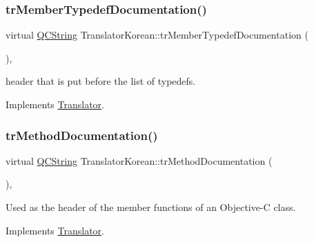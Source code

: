 \mbox{\label{class_translator_korean_a403e4a3b1720e6c420386296d72260aa}} 
\subsubsection{\texorpdfstring{trMemberTypedefDocumentation()}{trMemberTypedefDocumentation()}}
{\footnotesize\ttfamily virtual \mbox{\hyperlink{class_q_c_string}{Q\+C\+String}} Translator\+Korean\+::tr\+Member\+Typedef\+Documentation (\begin{DoxyParamCaption}{ }\end{DoxyParamCaption})\hspace{0.3cm}{\ttfamily [inline]}, {\ttfamily [virtual]}}

header that is put before the list of typedefs. 

Implements \mbox{\hyperlink{class_translator}{Translator}}.

\mbox{\label{class_translator_korean_a755dec4d84768a66ec18c401c23f5e97}} 
\subsubsection{\texorpdfstring{trMethodDocumentation()}{trMethodDocumentation()}}
{\footnotesize\ttfamily virtual \mbox{\hyperlink{class_q_c_string}{Q\+C\+String}} Translator\+Korean\+::tr\+Method\+Documentation (\begin{DoxyParamCaption}{ }\end{DoxyParamCaption})\hspace{0.3cm}{\ttfamily [inline]}, {\ttfamily [virtual]}}

Used as the header of the member functions of an Objective-\/C class. 

Implements \mbox{\hyperlink{class_translator}{Translator}}.

\mbox{\label{class_translator_korean_a040e4dc351893d295b522fae7fa52ece}} 
